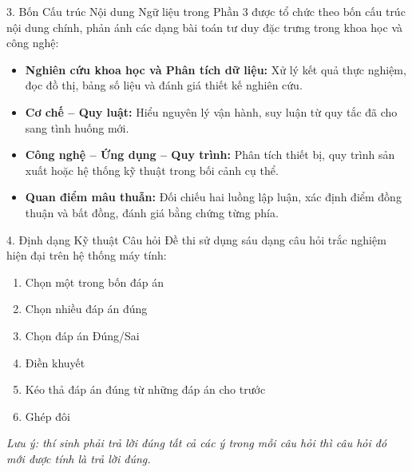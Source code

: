 \documentclass[12pt,a4paper,twoside]{article}
\begin{document}
\begin{sectionheader}{3. Bốn Cấu trúc Nội dung}
Ngữ liệu trong Phần 3 được tổ chức theo bốn cấu trúc nội dung chính, phản ánh các dạng bài toán tư duy đặc trưng trong khoa học và công nghệ:

\vspace{2pt}
\begin{itemize}[leftmargin=*, itemsep=5pt, label=\textcolor{accentBlue}{\textbf{--}}]
\item \textbf{Nghiên cứu khoa học và Phân tích dữ liệu:} Xử lý kết quả thực nghiệm, đọc đồ thị, bảng số liệu và đánh giá thiết kế nghiên cứu.
\item \textbf{Cơ chế -- Quy luật:} Hiểu nguyên lý vận hành, suy luận từ quy tắc đã cho sang tình huống mới.
\item \textbf{Công nghệ -- Ứng dụng -- Quy trình:} Phân tích thiết bị, quy trình sản xuất hoặc hệ thống kỹ thuật trong bối cảnh cụ thể.
\item \textbf{Quan điểm mâu thuẫn:} Đối chiếu hai luồng lập luận, xác định điểm đồng thuận và bất đồng, đánh giá bằng chứng từng phía.
\end{itemize}
\end{sectionheader}
\vspace{2pt}

\begin{sectionheader}{4. Định dạng Kỹ thuật Câu hỏi}
Đề thi sử dụng sáu dạng câu hỏi trắc nghiệm hiện đại trên hệ thống máy tính:

\vspace{2pt}
\begin{enumerate}[leftmargin=2em, itemsep=2pt, label=\textcolor{primaryBlue}{\textbf{\arabic*.}}]
\item Chọn một trong bốn đáp án
\item Chọn nhiều đáp án đúng
\item Chọn đáp án Đúng/Sai
\item Điền khuyết
\item Kéo thả đáp án đúng từ những đáp án cho trước
\item Ghép đôi
\end{enumerate}
\textit{Lưu ý: thí sinh phải trả lời đúng tất cả các ý trong mỗi câu hỏi thì câu hỏi đó mới được tính là trả lời đúng.}
\end{sectionheader}

\newpage
\end{document}
